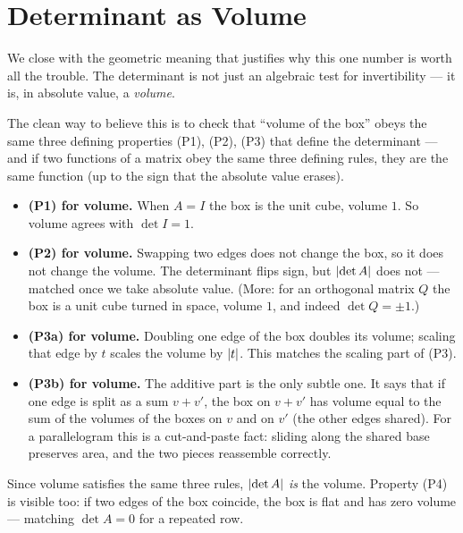 \section{Determinant as Volume}

We close with the geometric meaning that justifies why this one number is worth all the trouble. The determinant is not just an algebraic test for invertibility --- it is, in absolute value, a \emph{volume}.


The clean way to believe this is to check that ``volume of the box'' obeys the same three defining properties (P1), (P2), (P3) that define the determinant --- and if two functions of a matrix obey the same three defining rules, they are the same function (up to the sign that the absolute value erases).

\begin{itemize}
   \item \textbf{(P1) for volume.} When $A=I$ the box is the unit cube, volume $1$. So volume agrees with $\det I=1$.
   \item \textbf{(P2) for volume.} Swapping two edges does not change the box, so it does not change the volume. The determinant flips sign, but $\left|\det A\right|$ does not --- matched once we take absolute value. (More: for an orthogonal matrix $Q$ the box is a unit cube turned in space, volume $1$, and indeed $\det Q=\pm 1$.)
   \item \textbf{(P3a) for volume.} Doubling one edge of the box doubles its volume; scaling that edge by $t$ scales the volume by $\left|t\right|$. This matches the scaling part of (P3).
   \item \textbf{(P3b) for volume.} The additive part is the only subtle one. It says that if one edge is split as a sum $v+v'$, the box on $v+v'$ has volume equal to the sum of the volumes of the boxes on $v$ and on $v'$ (the other edges shared). For a parallelogram this is a cut-and-paste fact: sliding along the shared base preserves area, and the two pieces reassemble correctly.
\end{itemize}

Since volume satisfies the same three rules, $\left|\det A\right|$ \emph{is} the volume. Property (P4) is visible too: if two edges of the box coincide, the box is flat and has zero volume --- matching $\det A=0$ for a repeated row.


